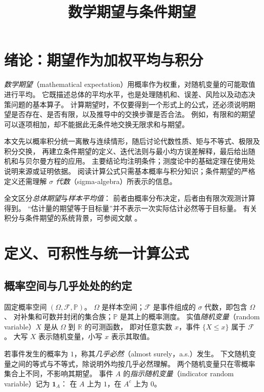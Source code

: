 \documentclass[UTF8,12pt,a4paper,fontset=fandol]{ctexart}
\title{数学期望与条件期望}
\author{}
\date{}
\begin{document}
\maketitle
\tableofcontents

\section{绪论：期望作为加权平均与积分}
\label{sec:expectation-introduction}

\emph{数学期望}（mathematical expectation）用概率作为权重，对随机变量的可能取值进行平均。
它既描述总体的平均水平，也是处理随机和、误差、风险以及动态决策问题的基本算子。
计算期望时，不仅要得到一个形式上的公式，还必须说明期望是否存在、是否有限，以及推导中的交换步骤是否合法。
例如，有限和的期望可以逐项相加，却不能据此无条件地交换无限求和与期望。

本文先以概率积分统一离散与连续情形，随后讨论代数性质、矩与不等式、极限及积分交换，
再建立条件期望的定义、迭代法则与最小均方误差解释，最后给出随机和与贝尔曼方程的应用。
主要结论均注明条件；测度论中的基础定理在使用处说明来源或证明依据。
阅读计算公式只需基本概率与积分知识；条件期望的严格定义还需理解
\emph{$\sigma$ 代数}（sigma-algebra）所表示的信息。

全文区分\emph{总体期望}与\emph{样本平均值}：
前者由概率分布决定，后者由有限次观测计算得到。
“估计量的期望等于目标量”并不表示一次实际估计必然等于目标量。
有关积分与条件期望的系统背景，可参阅文献 \cite{durrett-pte,sheffield-probability}。

\section{定义、可积性与统一计算公式}
\label{sec:expectation-definition}

\subsection{概率空间与几乎处处的约定}

固定概率空间 $(\Omega,\mathcal F,\mathbb P)$。
$\Omega$ 是样本空间；$\mathcal F$ 是事件组成的 $\sigma$ 代数，即包含 $\Omega$、
对补集和可数并封闭的集合族；$\mathbb P$ 是其上的概率测度。
实值\emph{随机变量}（random variable）$X$ 是从 $\Omega$ 到 $\mathbb R$ 的可测函数，
即对任意实数 $x$，事件 $\{X\leq x\}$ 属于 $\mathcal F$。
大写 $X$ 表示随机变量，小写 $x$ 表示其取值。

若事件发生的概率为 $1$，称其\emph{几乎必然}（almost surely，a.s.）发生。
下文随机变量之间的等式与不等式，除说明外均按几乎必然理解。
两个随机变量只在零概率集合上不同，不影响其期望。
事件 $A$ 的\emph{指示随机变量}（indicator random variable）记为 $\mathbf1_A$：
在 $A$ 上为 $1$，在 $A^c$ 上为 $0$。
\end{document}
